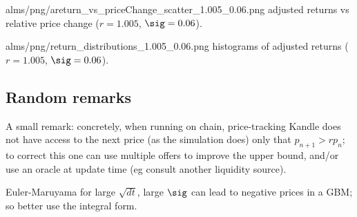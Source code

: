 \documentclass[oneside,10pt]{article}
\begin{document}
\IG{420pt}
{alms/png/areturn_vs_priceChange_scatter_1.005_0.06.png}
{\label{1.005-0.06ar} adjusted returns vs relative price change ($r=1.005$, $\sig=0.06$).}

\IG{420pt}
{alms/png/return_distributions_1.005_0.06.png}
{\label{1.005-0.06h} histograms of adjusted returns ($r=1.005$, $\sig=0.06$).}

\subsection{Random remarks}

A small remark: concretely, when running on chain, price-tracking Kandle does not have access to the next price (as the simulation does)
only that $p_{n+1}>r p_n$;
to correct this one can use multiple offers to improve the upper bound,
and/or use an oracle at update time (eg consult another liquidity source).

Euler-Maruyama for large $\sqrt{dt}$, large $\sig$ can lead to negative prices in a GBM;
so better use the integral form. 
\end{document}
